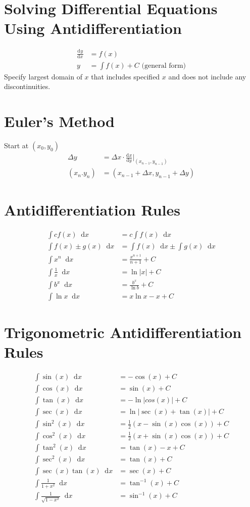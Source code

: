 \documentclass[12pt]{article}
\newcommand*{\rmaskip}{\setlength{\abovedisplayskip}{0pt}}
\newcommand*{\rmbskip}{\setlength{\belowdisplayskip}{0pt}}
\newcommand*{\rmskip}{\rmaskip \rmbskip}
\newcommand*{\dd}[3][]{\tfrac{\mathrm{d}^{#1}#2}{\mathrm{d}#3^{#1}}}
\newcommand*{\D}[1]{\mathop{}\!\mathrm{d} #1}
\begin{document}
\section*{Solving Differential Equations Using Antidifferentiation}
{\rmaskip\begin{align*}
  \dd{y}{x} &= f(x)\\
  y &= \int f(x) + C \text{ (general form)}
\end{align*}}%
Specify largest domain of \(x\) that includes specified \(x\) and does not
include any discontinuities.
\section*{Euler's Method}
Start at \((x_0,y_0)\)
{\rmbskip\begin{align*}
  \Delta y &= \Delta x \cdot \dd{x}{y} \biggr|_{(x_{n-1},y_{n-1})} \\
  (x_n.y_n) &= (x_{n-1} + \Delta x, y_{n-1} + \Delta y)
\end{align*}}%
\section*{Antidifferentiation Rules}
{\rmskip\begin{align*}
  \int cf(x) \D{x} &= c \int f(x) \D{x}\\
  \int f(x) \pm g(x) \D{x} &= \int f(x) \D{x} \pm \int g(x) \D{x}\\
  \int x^n \D{x} &= \frac{x^{n+1}}{n+1} + C\\
  \int \frac{1}{x} \D{x} &= \ln|x| + C\\
  \int b^x \D{x} &= \frac{b^x}{\ln b} + C\\
  \int \ln x \D{x} &= x\ln x - x + C
\end{align*}}%
\section*{Trigonometric Antidifferentiation Rules}
{\rmskip\begin{align*}
  \int \sin(x) \D{x} &= -\cos(x) + C\\
  \int \cos(x) \D{x} &= \sin(x) + C\\
  \int \tan(x) \D{x} &= -\ln|cos(x)| + C\\
  \int \sec(x) \D{x} &= \ln|\sec(x)+\tan(x)| + C\\
  \int \sin^2(x) \D{x} &= \frac{1}{2} (x - \sin(x)\cos(x)) + C\\
  \int \cos^2(x) \D{x} &= \frac{1}{2} (x + \sin(x)\cos(x)) + C\\
  \int \tan^2(x) \D{x} &= \tan(x) - x + C\\
  \int \sec^2(x) \D{x} &= \tan(x) + C\\
  \int \sec(x) \tan(x) \D{x} &= \sec(x) + C\\
  \int \frac{1}{1+x^2} \D{x} &= \tan^{-1}(x) + C\\
  \int \frac{1}{\sqrt{1-x^2}} \D{x} &= \sin^{-1}(x) + C
\end{align*}}%
\end{document}
